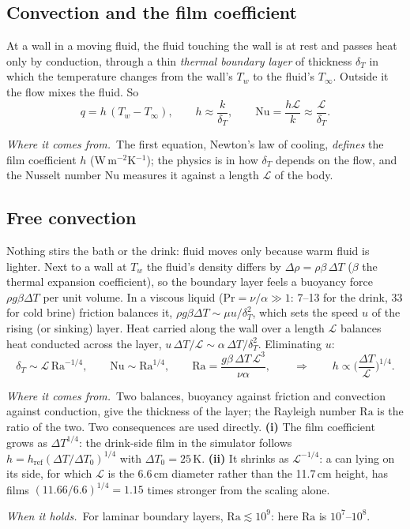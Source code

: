 \documentclass[11pt,a4paper]{article}
\newcommand{\where}{\par\noindent\textit{Where it comes from.}\ }
\newcommand{\holds}{\par\noindent\textit{When it holds.}\ }
\begin{document}
\subsection{Convection and the film coefficient}
\label{sec:film}
At a wall in a moving fluid, the fluid touching the wall is at rest and passes heat only by
conduction, through a thin \emph{thermal boundary layer} of thickness $\delta_T$ in which the
temperature changes from the wall's $T_w$ to the fluid's $T_\infty$. Outside it the flow mixes the
fluid. So
\begin{equation}
q = h\,(T_w - T_\infty),\qquad h \approx \frac{k}{\delta_T},\qquad
\mathrm{Nu} = \frac{h\mathcal L}{k} \approx \frac{\mathcal L}{\delta_T} .
\label{eq:newton}
\end{equation}
\where The first equation, Newton's law of cooling, \emph{defines} the film coefficient $h$
(W\,m$^{-2}$K$^{-1}$); the physics is in how $\delta_T$ depends on the flow, and the Nusselt number
$\mathrm{Nu}$ measures it against a length $\mathcal L$ of the body.

\subsection{Free convection}
\label{sec:freeconv}
Nothing stirs the bath or the drink: fluid moves only because warm fluid is lighter. Next to a wall at
$T_w$ the fluid's density differs by $\Delta\rho = \rho\beta\,\Delta T$ ($\beta$ the thermal expansion
coefficient), so the boundary layer feels a buoyancy force $\rho g\beta\Delta T$ per unit volume. In a
viscous liquid ($\mathrm{Pr} = \nu/\alpha \gg 1$: 7–13 for the drink, 33 for cold brine) friction
balances it, $\rho g\beta\Delta T \sim \mu u/\delta_T^2$, which sets the speed $u$ of the rising (or
sinking) layer. Heat carried along the wall over a length $\mathcal L$ balances heat conducted across
the layer, $u\,\Delta T/\mathcal L \sim \alpha\,\Delta T/\delta_T^2$. Eliminating $u$:
\begin{equation}
\delta_T \sim \mathcal L\,\mathrm{Ra}^{-1/4},\qquad
\mathrm{Nu} \sim \mathrm{Ra}^{1/4},\qquad
\mathrm{Ra} = \frac{g\beta\,\Delta T\,\mathcal L^3}{\nu\alpha},
\qquad\Longrightarrow\qquad
h \propto \Big(\frac{\Delta T}{\mathcal L}\Big)^{1/4}.
\label{eq:freeconv}
\end{equation}
\where Two balances, buoyancy against friction and convection against conduction, give the
thickness of the layer; the Rayleigh number $\mathrm{Ra}$ is the ratio of the two. Two consequences are
used directly. \textbf{(i)} The film coefficient grows as $\Delta T^{1/4}$: the drink-side film in the
simulator follows $h = h_{\text{ref}}(\Delta T/\Delta T_0)^{1/4}$ with $\Delta T_0 = 25$\,K.
\textbf{(ii)} It shrinks as $\mathcal L^{-1/4}$: a can lying on its side, for which $\mathcal L$ is the
6.6\,cm diameter rather than the 11.7\,cm height, has films $(11.66/6.6)^{1/4} = 1.15$ times stronger
from the scaling alone.
\holds For laminar boundary layers, $\mathrm{Ra} \lesssim 10^9$: here $\mathrm{Ra}$ is $10^7$–$10^8$.
\end{document}

